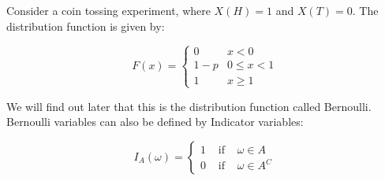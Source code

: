 \documentclass[12pt]{extbook}
\begin{document}
Consider a coin tossing experiment, where $X(H)=1$ and $X(T)=0$.   The distribution function is given by:

\begin{displaymath}
F(x) = \left\{ \begin{array}{ll} 0 & x < 0 \\ 1-p & 0  \leq x < 1 \\ 1 & x  \geq 1 \end{array} \right.
\end{displaymath}

We will find out later that this is the distribution function called Bernoulli.   Bernoulli variables can also be defined by Indicator variables:

\begin{displaymath}
I_A(\omega) =\left\{ \begin{array}{lrl} 1 & \mbox{ if } & \omega \in A \\ 0 & \mbox{ if } & \omega \in A^C \end{array} \right.
\end{displaymath}











\end{document}
